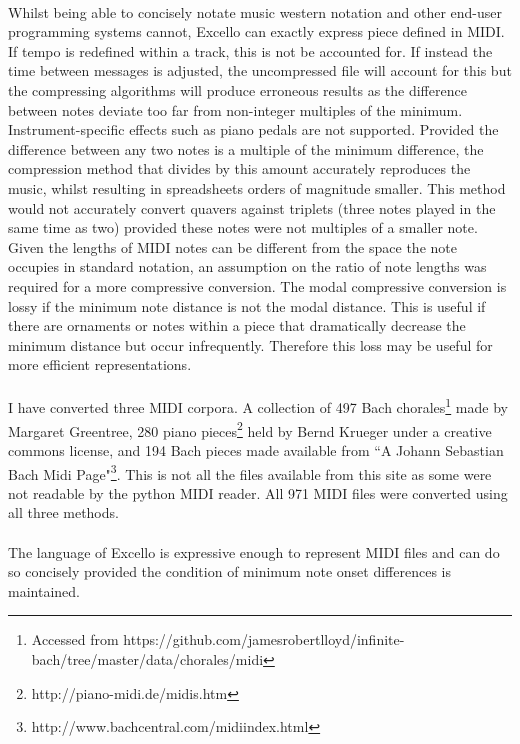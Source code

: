 \paragraph{} Whilst being able to concisely notate music western notation and other end-user programming systems cannot, Excello can exactly express piece defined in MIDI. If tempo is redefined within a track, this is not be accounted for. If instead the time between messages is adjusted, the uncompressed file will account for this but the compressing algorithms will produce erroneous results as the difference between notes deviate too far from non-integer multiples of the minimum. Instrument-specific effects such as piano pedals are not supported. Provided the difference between any two notes is a multiple of the minimum difference, the compression method that divides by this amount accurately reproduces the music, whilst resulting in spreadsheets orders of magnitude smaller. This method would not accurately convert quavers against triplets (three notes played in the same time as two) provided these notes were not multiples of a smaller note. Given the lengths of MIDI notes can be different from the space the note occupies in standard notation, an assumption on the ratio of note lengths was required for a more compressive conversion. The modal compressive conversion is lossy if the minimum note distance is not the modal distance. This is useful if there are ornaments or notes within a piece that dramatically decrease the minimum distance but occur infrequently. Therefore this loss may be useful for more efficient representations.

\paragraph{} I have converted three MIDI corpora. A collection of 497 Bach chorales\footnote{Accessed from https://github.com/jamesrobertlloyd/infinite-bach/tree/master/data/chorales/midi} made by Margaret Greentree, 280 piano pieces\footnote{http://piano-midi.de/midis.htm} held by Bernd Krueger under a creative commons license, and 194 Bach pieces made available from ``A Johann Sebastian Bach Midi Page"\footnote{http://www.bachcentral.com/midiindex.html}. This is not all the files available from this site as some were not readable by the python MIDI reader. All 971 MIDI files were converted using all three methods.

\paragraph{} The language of Excello is expressive enough to represent MIDI files and can do so concisely provided the condition of minimum note onset differences is maintained.

